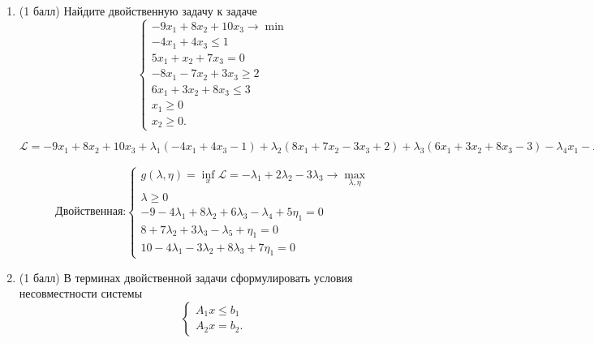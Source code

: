 \documentclass[a5paper,twoside,russian]{article}
\begin{document}
\begin{enumerate}[label=\textbf{Задача \arabic*.}]
        \item (1 балл) Найдите двойственную задачу к задаче
        \begin{equation*}
            \begin{cases}
                -9x_1 + 8x_2+10x_3 \rightarrow \min \\
                -4x_1 + 4x_3 \leq 1 \\
                5x_1 + x_2 + 7x_3 = 0 \\
                -8x_1 - 7x_2 + 3x_3 \geq 2 \\
                6x_1 + 3x_2 + 8x_3 \leq 3 \\
                x_1 \geq 0 \\
                x_2 \geq 0.
            \end{cases}
        \end{equation*}

        \begin{prf}
            $\mathcal{L} = -9x_1 + 8x_2 + 10x_3 + \lambda_1 (-4x_1 + 4x_3 - 1) + \lambda_2 (8x_1 + 7x_2 - 3x_3 + 2) +
            \lambda_3 (6x_1 + 3x_2 + 8x_3 - 3) - \lambda_4 x_1 - \lambda_5 x_2 + \eta_1 (5x_1 + x_2 + 7x_3)$

            \[
                \text{Двойственная:}
                \left\{\!
                \begin{array}{l}
                    g(\lambda, \eta) = \inf\limits_{x} \mathcal{L} = -\lambda_1 + 2 \lambda_2 - 3\lambda_3 \rightarrow \max\limits_{\lambda, \eta}\\
                    \lambda \geq 0                                                                                                                 \\
                    -9 - 4\lambda_1 + 8\lambda_2 + 6\lambda_3 - \lambda_4 + 5\eta_1 = 0                                                            \\
                    8 + 7\lambda_2 + 3\lambda_3 - \lambda_5 + \eta_1 = 0                                                                           \\
                    10 - 4\lambda_1 - 3\lambda_2 + 8\lambda_3 + 7\eta_1 = 0
                \end{array}
                \right.
            \]
        \end{prf}

        \item (1 балл) В терминах двойственной задачи сформулировать условия несовместности системы
        \begin{equation*}
            \begin{cases}
                A_1 x \leq b_1 \\
                A_2 x = b_2.
            \end{cases}
        \end{equation*}


\end{enumerate}
\end{document}
